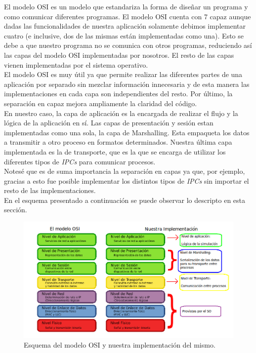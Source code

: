\documentclass[a4paper,10pt]{article}
\begin{document}
El modelo OSI es un modelo que estandariza la forma de diseñar un programa y como comunicar diferentes programas. El modelo OSI cuenta con 7 capaz aunque dadas las funcionalidades de nuestra aplicación solamente debimos implementar cuatro (e inclusive, dos de las
  mismas están implementadas como una). Esto se debe a que nuestro programa no se comunica con otros programas, reduciendo así las capas del modelo OSI implementadas por nosotros.
  El resto de las capas vienen implementadas por el sistema operativo.\\

El modelo OSI es muy útil ya que permite realizar las diferentes partes de una aplicación por separado sin mezclar información innecesaria y de esta manera las implementaciones 
en cada capa son independientes del resto. Por último, la separación en capaz mejora ampliamente la claridad del código.\\

En nuestro caso, la capa de aplicación es la encargada de realizar el flujo y la lógica de la aplicación en sí. Las capas de presentación y sesión estan implementadas como una sola,
 la capa de Marshalling. Esta empaqueta los datos a transmitir a otro proceso en formatos determinados. 
 Nuestra última capa implementada es la de transporte, que es la que se encarga de utilizar los diferentes tipos de \textit{IPCs} para comunicar procesos.\\

Notesé que es de suma importancia la separación en capas ya que, por ejemplo, gracias a esto fue posible implementar los distintos tipos de \textit{IPCs} sin importar el resto de las implementaciones.\\

En el esquema presentado a continuación se puede observar lo descripto en esta sección. \\

\begin{figure}[H]
\begin{center}
 \includegraphics[scale=0.5]{./images/modelo-osi_nuestro.png}
 \caption{Esquema del modelo OSI y nuestra implementación del mismo.}
\end{center}
\end{figure}
\end{document}
